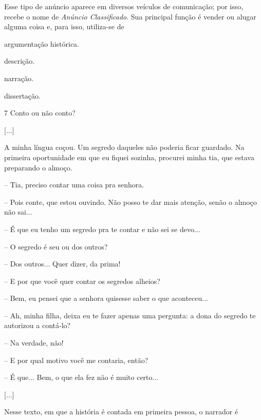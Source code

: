 Esse tipo de anúncio aparece em diversos veículos de comunicação; por
isso, recebe o nome de \emph{Anúncio Classificado}. Sua principal função
é vender ou alugar alguma coisa e, para isso, utiliza-se de

\begin{escolha}
\item argumentação histórica.

\item descrição.

\item narração.

\item dissertação.
\end{escolha}


\num{7} Conto ou não conto?

\begin{myquote}
{[}...{]}

A minha língua coçou. Um segredo daqueles não poderia ficar guardado. Na
primeira oportunidade em que eu fiquei sozinha, procurei minha tia, que
estava preparando o almoço.

-- Tia, preciso contar uma coisa pra senhora.

-- Pois conte, que estou ouvindo. Não posso te dar mais atenção, senão o
almoço não sai...

-- É que eu tenho um segredo pra te contar e não sei se devo...

-- O segredo é seu ou dos outros?

-- Dos outros... Quer dizer, da prima!

-- E por que você quer contar os segredos alheios?

-- Bem, eu pensei que a senhora quisesse saber o que aconteceu...

-- Ah, minha filha, deixa eu te fazer apenas uma pergunta: a dona do
segredo te autorizou a contá-lo?

-- Na verdade, não!

-- E por qual motivo você me contaria, então?

-- É que... Bem, o que ela fez não é muito certo...

{[}...{]}

\end{myquote}

Nesse texto, em que a história é contada em primeira pessoa, o narrador
é

